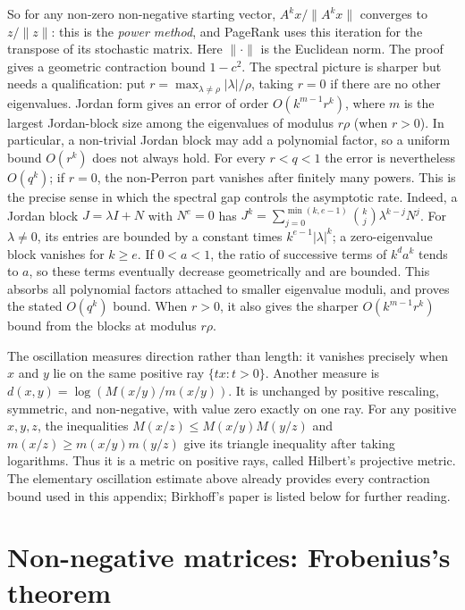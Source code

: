 So for any non-zero non-negative starting vector, $A^kx/\|A^kx\|$ converges to
$z/\|z\|$: this is the \emph{power method}, and
PageRank uses this iteration for the transpose of its stochastic matrix.
Here $\|\cdot\|$ is the Euclidean norm. The proof gives a geometric contraction bound $1-c^2$. The spectral picture is sharper but needs a qualification:
put $r=\max_{\lambda\ne\rho}|\lambda|/\rho$, taking $r=0$ if there are no other eigenvalues. Jordan form gives an error of order
$O(k^{m-1}r^k)$, where $m$ is the largest Jordan-block size among the eigenvalues of
modulus $r\rho$ (when $r>0$). In particular, a non-trivial Jordan block may add a
polynomial factor, so a uniform bound $O(r^k)$ does not always hold. For every
$r<q<1$ the error is nevertheless $O(q^k)$; if $r=0$, the non-Perron part vanishes
after finitely many powers. This is the precise sense in which the spectral gap
controls the asymptotic rate.
Indeed, a Jordan block $J=\lambda I+N$ with $N^e=0$ has
$J^k=\sum_{j=0}^{\min(k,e-1)}\binom{k}{j}\lambda^{k-j}N^j$.
For $\lambda\ne0$, its entries are bounded by a constant times
$k^{e-1}|\lambda|^k$; a zero-eigenvalue block vanishes for $k\ge e$.
If $0<a<1$, the ratio of successive terms of $k^d a^k$ tends to $a$,
so these terms eventually decrease geometrically and are bounded.
This absorbs all polynomial factors attached to smaller eigenvalue moduli,
and proves the stated $O(q^k)$ bound. When $r>0$, it also gives the sharper
$O(k^{m-1}r^k)$ bound from the blocks at modulus $r\rho$.

\begin{remark}
The oscillation measures direction rather than length: it vanishes precisely
when $x$ and $y$ lie on the same positive ray $\{tx:t>0\}$. Another measure is
$d(x,y)=\log(M(x/y)/m(x/y))$. It is unchanged by positive rescaling, symmetric,
and non-negative, with value zero exactly on one ray. For any positive $x,y,z$, the inequalities
$M(x/z)\le M(x/y)M(y/z)$ and $m(x/z)\ge m(x/y)m(y/z)$ give its triangle
inequality after taking logarithms. Thus it is a metric on positive rays,
called Hilbert's projective metric. The elementary oscillation estimate above
already provides every contraction bound used in this appendix; Birkhoff's
paper is listed below for further reading.
\end{remark}

\section{Non-negative matrices: Frobenius's theorem}

